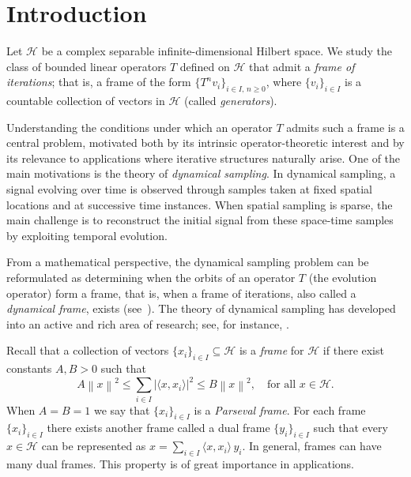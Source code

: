 \documentclass[a4paper,12pt]{amsart}
\def\HH{{\mathcal{H}}}
\newcommand{\norm}[1]{{\left\|{#1}\right\|}}
\newcommand{\abs}[1]{{\left|{#1}\right|}}
\newcommand{\scal}[1]{{\langle{#1}\rangle}}
\theoremstyle{definition}
\begin{document}
\maketitle

\section{Introduction}

Let $\HH$ be a complex separable infinite-dimensional Hilbert space. We study the class of bounded linear operators $T$ defined on $\HH$ that admit a {\em frame of iterations}; that is, a frame of the form $\{T^n v_i\}_{i \in I,\, n \geqslant 0}$, where $\{v_i\}_{i \in I}$ is a countable collection of vectors in $\HH$ (called {\em generators}).

Understanding the conditions under which an operator $T$ admits such a frame is a central problem, motivated both by its intrinsic operator-theoretic interest and by its relevance to applications where iterative structures naturally arise. One of the main  motivations is the theory of {\em dynamical sampling}. In dynamical sampling, a signal evolving over time is observed through samples taken at fixed spatial locations and at successive time instances. When spatial sampling is sparse, the main challenge is to reconstruct the initial signal from these space-time samples by exploiting temporal evolution.

From a mathematical perspective, the dynamical sampling problem can be reformulated as determining when the orbits of an operator $T$ (the evolution operator) form a frame, that is, when a frame of iterations,  also called a {\em dynamical frame}, exists (see~\cite{ACMT}). The theory of dynamical sampling has developed into an active and rich area of research; see, for instance, \cite{ADK13,AAK19,AT14,ACMT,ACCMP17,AP17,CMPP20,CHS18,CMS21,CHP,DMM21,DMMM2021-1,MMO23,DLW24,Philipp17,Tang17,AK17,ACCP,CHPS24}.

Recall that a collection of vectors $\{x_i\}_{i\in I}\subseteq\HH$ is a
{\em frame} for $\HH$ if there exist constants $A,B>0$ such that
\begin{equation*}
A\norm{x}^2 \leqslant \sum_{i\in I} \abs{\scal{x,x_i}}^2 \leqslant B\norm{x}^2,
\quad \text{for all } x\in\HH.
\end{equation*}
When $A=B=1$ we say that $\{x_i\}_{i\in I}$ is a {\em Parseval frame}.  For each frame $\{x_i\}_{i\in I}$ there exists another frame  called a  dual frame $\{y_i\}_{i\in I}$ such that every $x\in\HH$ can be represented as $x=\sum_{i\in I}\scal{x,x_i}\,y_i$. In general, frames can have many dual frames. This property is of great importance in applications.
\end{document}
